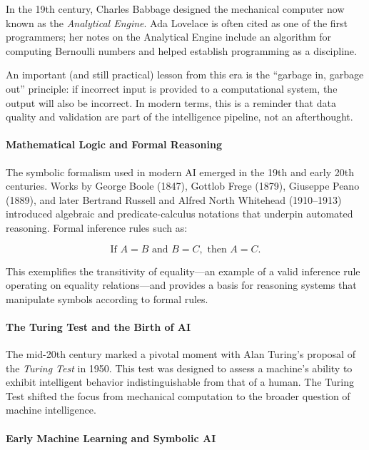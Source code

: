 In the 19th century, Charles Babbage designed the mechanical computer now known as the \emph{Analytical Engine}. Ada Lovelace is often cited as one of the first programmers; her notes on the Analytical Engine include an algorithm for computing Bernoulli numbers and helped establish programming as a discipline.

An important (and still practical) lesson from this era is the ``garbage in, garbage out'' principle: if incorrect input is provided to a computational system, the output will also be incorrect. In modern terms, this is a reminder that data quality and validation are part of the intelligence pipeline, not an afterthought.

\paragraph{Mathematical Logic and Formal Reasoning}

The symbolic formalism used in modern AI emerged in the 19th and early 20th centuries. Works by George Boole (1847), Gottlob Frege (1879), Giuseppe Peano (1889), and later Bertrand Russell and Alfred North Whitehead (1910--1913) introduced algebraic and predicate-calculus notations that underpin automated reasoning. Formal inference rules such as:

\[
\text{If } A = B \text{ and } B = C, \text{ then } A = C.
\]

This exemplifies the transitivity of equality---an example of a valid inference rule operating on equality relations---and provides a basis for reasoning systems that manipulate symbols according to formal rules.

\paragraph{The Turing Test and the Birth of AI}

The mid-20th century marked a pivotal moment with Alan Turing's proposal of the \emph{Turing Test} in 1950. This test was designed to assess a machine's ability to exhibit intelligent behavior indistinguishable from that of a human. The Turing Test shifted the focus from mechanical computation to the broader question of machine intelligence.

\paragraph{Early Machine Learning and Symbolic AI}

